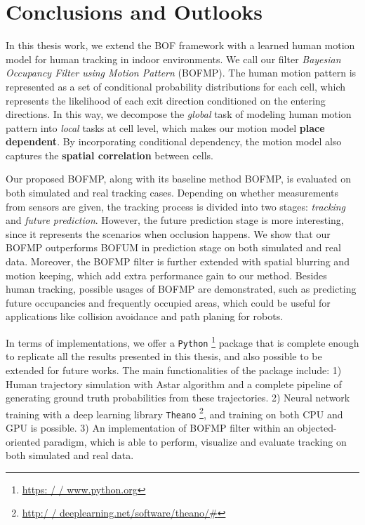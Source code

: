 \chapter{Conclusions and Outlooks} \label{chapter:6}

In this thesis work, we extend the BOF framework with a learned human motion model for human tracking in indoor environments. We call our filter \textit{Bayesian Occupancy Filter using Motion Pattern} (BOFMP). The human motion pattern is represented as a set of conditional probability distributions for each cell, which represents the likelihood of each exit direction conditioned on the entering directions. In this way, we decompose the \textit{global} task of modeling human motion pattern into \textit{local} tasks at cell level, which makes our motion model \textbf{place dependent}. By incorporating conditional dependency, the motion model also captures the \textbf{spatial correlation} between cells.

Our proposed BOFMP, along with its baseline method BOFMP, is evaluated on both simulated and real tracking cases. Depending on whether measurements from sensors are given, the tracking process is divided into two stages: \textit{tracking} and \textit{future prediction}. However, the future prediction stage is more interesting, since it represents the scenarios when occlusion happens. We show that our BOFMP outperforms BOFUM in prediction stage on both simulated and real data. Moreover, the BOFMP filter is further extended with spatial blurring and motion keeping, which add extra performance gain to our method. Besides human tracking, possible usages of BOFMP are demonstrated, such as predicting future occupancies and frequently occupied areas, which could be useful for applications like collision avoidance and path planing for robots.

In terms of implementations, we offer a \texttt{Python} \footnote{\url{https: / / www.python.org}} package that is complete enough to replicate all the results presented in this thesis, and also possible to be extended for future works. The main functionalities of the package include: 1) Human trajectory simulation with Astar algorithm and a complete pipeline of generating ground truth probabilities from these trajectories. 2) Neural network training with a deep learning library \texttt{Theano} \footnote{\url{http:/ / deeplearning.net/software/theano/\#}}, and training on both CPU and GPU is possible. 3) An implementation of BOFMP filter within an objected-oriented paradigm, which is able to perform, visualize and evaluate tracking on both simulated and real data.

